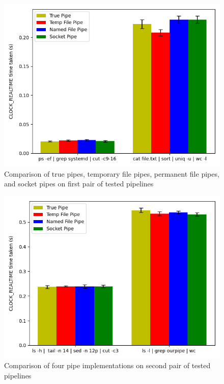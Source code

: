 \begin{figure}[!htp]
    \vspace{-0.0cm}
    \centering
    \includegraphics[width=0.95\linewidth]{12.png} \vspace{-0.1cm}
    \caption{\small Comparison of true pipes, temporary file pipes, permanent file pipes, and socket pipes on first pair of tested pipelines} 
    \label{fig12}
    \vspace{-0.3cm}
\end{figure}

\begin{figure}[!htp]
    \vspace{-0.0cm}
    \centering
    \includegraphics[width=0.95\linewidth]{34.png} \vspace{-0.1cm}
    \caption{\small Comparison of four pipe implementations on second pair of tested pipelines} 
    \label{fig34}
    \vspace{-0.3cm}
\end{figure}

